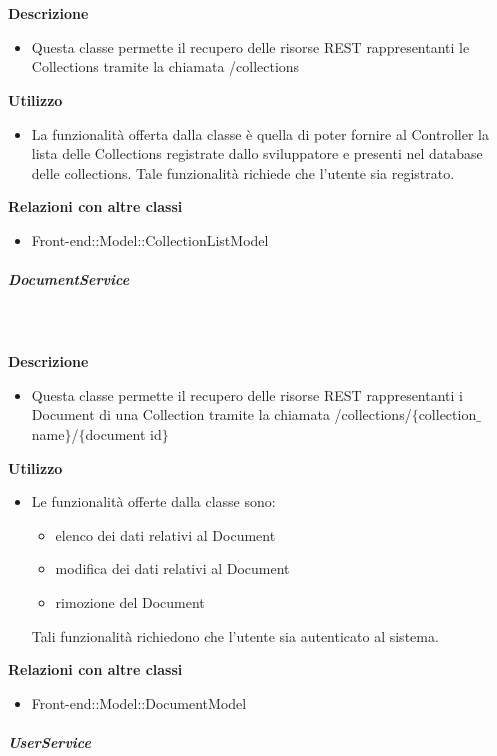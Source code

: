 				\textbf{\\ \\ Descrizione} 
					\begin{itemize}
						\item[] Questa classe permette il recupero delle risorse REST rappresentanti le Collections tramite la chiamata /collections
					\end{itemize}      
				\textbf{Utilizzo}  
					\begin{itemize}
						\item[] La funzionalità offerta dalla classe è quella di poter fornire al Controller la lista delle Collections registrate dallo sviluppatore e presenti nel database delle collections.
Tale funzionalità richiede che l'utente sia registrato.
					\end{itemize}
					\textbf{Relazioni con altre classi}
					\begin{itemize}
							\item{Front-end::Model::CollectionListModel}
					\end{itemize}
			\subparagraph{DocumentService}
				
				\textbf{\\ \\ Descrizione} 
					\begin{itemize}
						\item[] Questa classe permette il recupero delle risorse REST rappresentanti i Document di una Collection tramite la chiamata /collections/$\{$collection$\_$name$\}$/$\{$document id$\}$
					\end{itemize}      
				\textbf{Utilizzo}  
					\begin{itemize}
						\item[] Le funzionalità offerte dalla classe sono: 
\begin{itemize} 
\item elenco dei dati relativi al Document 
\item modifica dei dati relativi al Document
\item rimozione del Document 
\end{itemize} 
Tali funzionalità richiedono che l'utente sia autenticato al sistema.
					\end{itemize}
					\textbf{Relazioni con altre classi}
					\begin{itemize}
							\item{Front-end::Model::DocumentModel}
					\end{itemize}
			\subparagraph{UserService}
				
